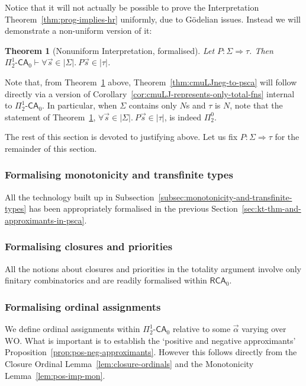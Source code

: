 \documentclass[10pt,a4paper]{amsart}
\theoremstyle{plain}
\newtheorem{theorem}[theorem]{Theorem}
\theoremstyle{definition}
\renewcommand{\phi}{\varphi}
\newcommand{\oldtodo}[1]{\todo{#1}} %
\renewcommand{\todo}[1]{}
\theoremstyle{plain}
\theoremstyle{definition} %
\newcommand{\nat}{\mathit{N}}
\newcommand{\N}{\nat} %
\newcommand{\seqar}{\Rightarrow}
\newcommand{\limp}{\to}
\newcommand{\proves}{\vdash}
\newcommand{\der}{P}
\newcommand{\Pin}[2]{\Pi^{#1}_{#2}}
\newcommand{\CA}{\mathsf{CA}}
\newcommand{\ca}[1]{#1\text{-}\CA}
\newcommand{\RCA}{\mathsf R \CA_0}
\newcommand{\PSCA}{\ca{\Pin 1 2 }_0}
\newcommand{\WO}{\mathrm{WO}}
\newcommand{\hr}[1]{|#1|}
\begin{document}
Notice that it will not actually be possible to prove the Interpretation Theorem~\ref{thm:prog-implies-hr} uniformly, due to G\"odelian issues.
Instead we will demonstrate a non-uniform version of it:
\begin{theorem}
    [Nonuniform Interpretation, formalised]
    \label{thm:interpretation-nonuniform-formalised}
    Let $\der:\Sigma \seqar \tau$.  
    Then
    $\PSCA \proves \forall \vec s \in \hr\Sigma .\  \der \vec s \in \hr \tau $.
\end{theorem}


Note that, from Theorem~\ref{thm:interpretation-nonuniform-formalised} above, Theorem~\ref{thm:cmuLJneg-to-psca} will follow directly via a version of Corollary~\ref{cor:cmuLJ-represents-only-total-fns} internal to $\PSCA$.
In particular, when $\Sigma$ contains only $\N$s and $\tau$ is $\N$, note that the statement of Theorem~\ref{thm:interpretation-nonuniform-formalised}, $\forall \vec s \in \hr\Sigma .\  \der \vec s \in \hr \tau $, is indeed $\Pin 0 2$.

The rest of this section is devoted to justifying  above.
Let us fix $P:\Sigma \seqar \tau$ for the remainder of this section.


\subsubsection*{Formalising monotonicity and transfinite types}
All the technology built up in Subsection~\ref{subsec:monotonicity-and-transfinite-types} has been appropriately formalised in the previous Section~\ref{sec:kt-thm-and-approximants-in-psca}.

\subsubsection*{Formalising closures and priorities}
All the notions about closures and priorities in the totality argument involve only finitary combinatorics and are readily formalised within $\RCA$.

\subsubsection*{Formalising ordinal assignments}
We define ordinal assignments within $\PSCA$ relative to some $\vec \alpha$ varying over $\WO$. 
% 
What is important is to establish the `positive and negative approximants' Proposition~\ref{prop:pos-neg-approximants}. 
However this follows directly from the Closure Ordinal Lemma~\ref{lem:closure-ordinals} and the Monotonicity Lemma~\ref{lem:pos-imp-mon}.
\end{document}
